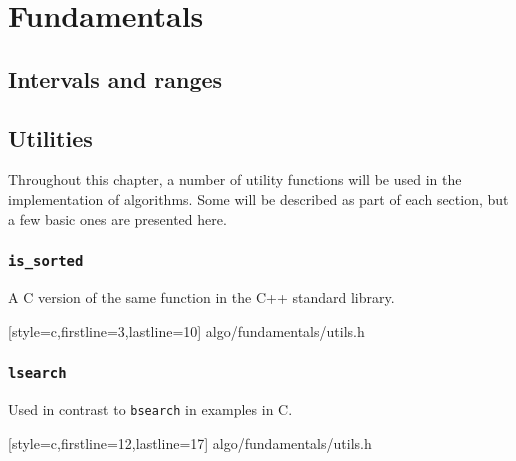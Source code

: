 \section{Fundamentals}

\subsection{Intervals and ranges}
\label{subsec:algo:ranges}

\subsection{Utilities}

Throughout this chapter, a number of utility functions will be used in the
implementation of algorithms.  Some will be described as part of each section,
but a few basic ones are presented here.

\subsubsection{\texttt{is\_sorted}}

A C version of the same function in the C++ standard library.


    [style=c,firstline=3,lastline=10]
    {algo/fundamentals/utils.h}
\vspace{-\baselineskip}

\subsubsection{\texttt{lsearch}}

Used in contrast to \texttt{bsearch} in examples in C.


    [style=c,firstline=12,lastline=17]
    {algo/fundamentals/utils.h}
\vspace{-\baselineskip}
